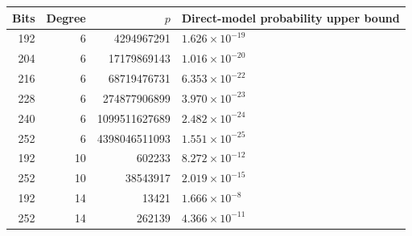\begin{tabular}{rrrl}
\toprule
Bits & Degree & $p$ & Direct-model probability upper bound\\
\midrule
192 & 6 & 4294967291 & $1.626\times10^{-19}$\\
204 & 6 & 17179869143 & $1.016\times10^{-20}$\\
216 & 6 & 68719476731 & $6.353\times10^{-22}$\\
228 & 6 & 274877906899 & $3.970\times10^{-23}$\\
240 & 6 & 1099511627689 & $2.482\times10^{-24}$\\
252 & 6 & 4398046511093 & $1.551\times10^{-25}$\\
192 & 10 & 602233 & $8.272\times10^{-12}$\\
252 & 10 & 38543917 & $2.019\times10^{-15}$\\
192 & 14 & 13421 & $1.666\times10^{-8}$\\
252 & 14 & 262139 & $4.366\times10^{-11}$\\
\bottomrule
\end{tabular}
